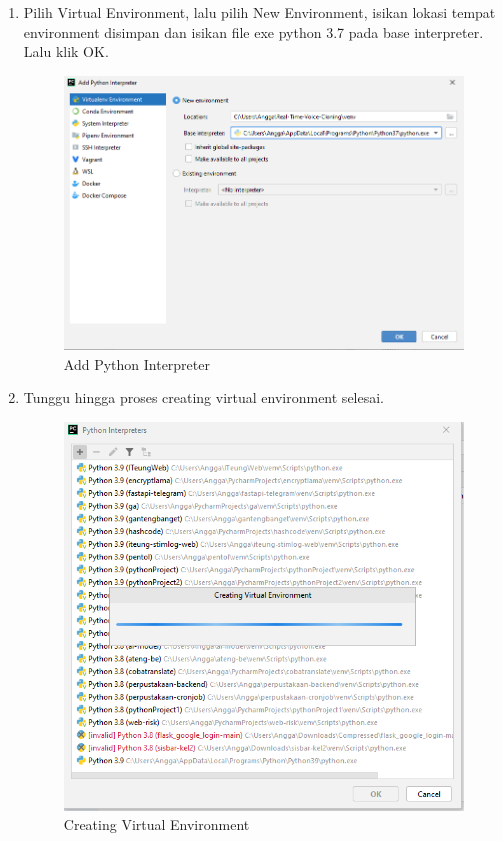\begin{enumerate}
\item Pilih Virtual Environment, lalu pilih New Environment, isikan lokasi tempat environment disimpan dan isikan file exe python 3.7  pada base interpreter. Lalu klik OK.
\begin{figure}[H]
\centering
\includegraphics[scale=.4]{figures/env3}
\caption{Add Python Interpreter}
\label{env3}
\end{figure}

\item Tunggu hingga proses creating virtual environment selesai.
\begin{figure}[H]
\centering
\includegraphics[scale=.4]{figures/env4}
\caption{Creating Virtual Environment}
\label{env4}
\end{figure}


\end{enumerate}

